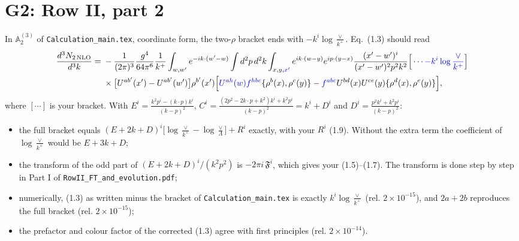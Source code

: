 \documentclass[10pt]{article}
\numberwithin{equation}{section}
\def\mf#1{\mathbb{#1}}
\newcommand{\new}[1]{{\color{blue}#1}}
\begin{document}
\section{G2: Row II, part 2}\label{sec:G2}
In $\mf A^{(3)}_2$ of \texttt{Calculation\_main.tex}, coordinate form, the two-$\rho$ bracket ends with $-k^i\log\frac{\vee}{k^+}$. Eq.~(1.3) should read
\begin{align}
\frac{d^3N_{2\,\rm NLO}}{d^3k}={}&-\frac{1}{(2\pi)^3}\frac{g^4}{64\pi^6}\frac{1}{k^+}\int_{w,w'}e^{-ik\cdot(w'-w)}\int d^2p\,d^2k\int_{x,y,\new{x'}}e^{ik\cdot(w-y)}e^{ip\cdot(y-x)}\frac{(x'-w')^i}{(x'-w')^2p^2k^2}\Big[\cdots\new{-k^i\log\frac{\vee}{k^+}}\Big]\notag\\
&\times\big[U^{ab'}(x')-U^{ab'}(w')\big]\rho^{b'}(x')\Big[\new{U^{ah}(w)f^{hbc}}\{\rho^b(x),\rho^c(y)\}-\new{f^{abc}}U^{bd}(x)U^{ce}(y)\{\rho^d(x),\rho^e(y)\}\Big],
\end{align}
where $[\cdots]$ is your bracket. With $E^i=\frac{k^2p^i-(k\cdot p)k^i}{(k-p)^2}$, $C^i=\frac{(2p^2-2k\cdot p+k^2)k^i+k^2p^i}{(k-p)^2}=k^i+D^i$ and $D^i=\frac{p^2k^i+k^2p^i}{(k-p)^2}$:
\begin{itemize}
\item the full bracket equals $(E+2k+D)^i\big[\log\frac{\vee}{k^+}-\log\frac{\vee}{\Lambda}\big]+R^i$ exactly, with your $R^i$ (1.9). Without the extra term the coefficient of $\log\frac{\vee}{k^+}$ would be $E+3k+D$;
\item the transform of the odd part of $(E+2k+D)^i/(k^2p^2)$ is $-2\pi i\,\mathfrak F^i$, which gives your (1.5)--(1.7). The transform is done step by step in Part I of \texttt{RowII\_FT\_and\_\allowbreak evolution.pdf};
\item numerically, (1.3) as written minus the bracket of \texttt{Calculation\_main.tex} is exactly $k^i\log\frac{\vee}{k^+}$ (rel. $2\times10^{-15}$), and $2a+2b$ reproduces the full bracket (rel. $2\times10^{-15}$);
\item the prefactor and colour factor of the corrected (1.3) agree with first principles (rel. $2\times10^{-14}$).
\end{itemize}

\end{document}
